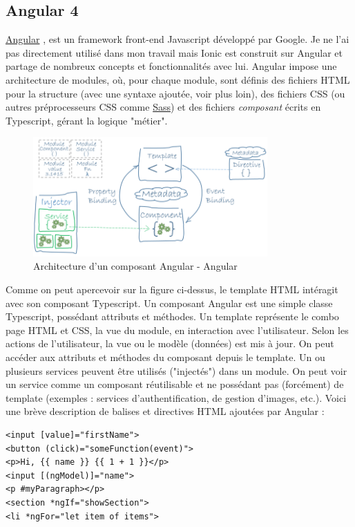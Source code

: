 \documentclass[a4paper, 12pt]{article}
\newenvironment{code}{\captionsetup{type=listing}}{}
\begin{document}
\subsection{Angular 4}
\href{https://angular.io/}{Angular} \cite{ref15}, \cite{ref21} est un framework front-end Javascript développé par Google.
Je ne l'ai pas directement utilisé dans mon travail mais Ionic est construit sur Angular et partage de nombreux concepts
et fonctionnalités avec lui.
Angular impose une architecture de modules, où, pour chaque module, sont définis des fichiers HTML pour la structure
(avec une syntaxe ajoutée, voir plus loin), des fichiers CSS (ou autres préprocesseurs CSS comme
\href{http://sass-lang.com/}{Sass}) et des fichiers \textit{composant} écrits en Typescript, gérant la logique "métier".
\begin{figure}
    \begin{center}
        \includegraphics[width=0.8\textwidth]{images/angular2.png}
    \end{center}
    \caption{Architecture d'un composant Angular - Angular \cite{ref13}}
\end{figure}
Comme on peut apercevoir sur la figure ci-dessus, le template HTML intéragit avec son composant Typescript.
Un composant Angular est une simple classe Typescript, possédant attributs et méthodes.
Un template représente le combo page HTML et CSS, la vue du module, en interaction avec l'utilisateur.
Selon les actions de l'utilisateur, la vue ou le modèle (données) est mis à jour. On peut accéder aux attributs et méthodes
du composant depuis le template. Un ou plusieurs services peuvent être utilisés ("injectés") dans un module. On peut
voir un service comme un composant réutilisable et ne possédant pas (forcément) de template (exemples : services
d'authentification, de gestion d'images, etc.).
Voici une brève description de balises et directives HTML ajoutées par Angular :
\begin{code}
    \begin{verbatim}
<input [value]="firstName">
<button (click)="someFunction(event)">
<p>Hi, {{ name }} {{ 1 + 1 }}</p>
<input [(ngModel)]="name">
<p #myParagraph></p>
<section *ngIf="showSection">
<li *ngFor="let item of items">
    \end{verbatim}
    \caption{Syntaxe HTML avec Angular}
\end{code}
\end{document}
